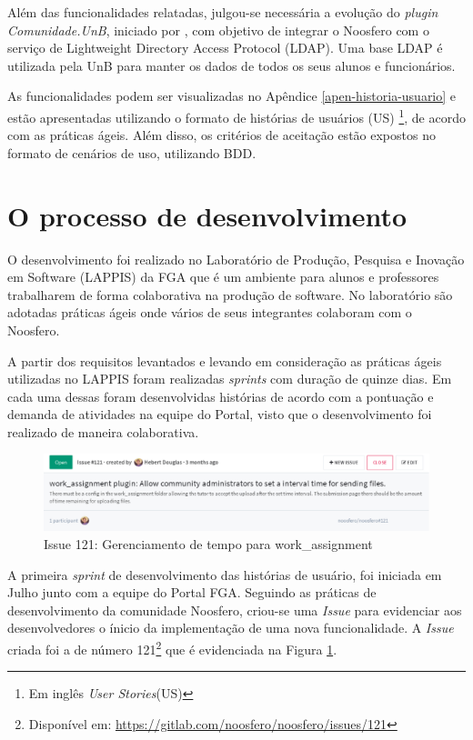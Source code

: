 Além das funcionalidades relatadas, julgou-se necessária a evolução do \textit{plugin Comunidade.UnB}, iniciado por , com objetivo de integrar o Noosfero com o serviço de Lightweight Directory Access Protocol (LDAP). Uma base LDAP é utilizada pela UnB para manter os dados de todos os seus alunos e funcionários.

As funcionalidades podem ser visualizadas no Apêndice \ref{apen-historia-usuario} e estão apresentadas utilizando o formato de histórias de usuários (US) \footnote{Em inglês \textit{User Stories}(US)}, de acordo com as práticas ágeis. Além disso, os critérios de aceitação estão expostos no formato de cenários de uso, utilizando BDD.

\section{O processo de desenvolvimento}

O desenvolvimento foi realizado no Laboratório de Produção, Pesquisa e Inovação em Software (LAPPIS) da FGA que é um ambiente para  alunos e professores trabalharem de forma colaborativa na produção de software. No laboratório são adotadas práticas ágeis onde vários de seus integrantes colaboram com o Noosfero.

A partir dos requisitos levantados e levando em consideração as práticas ágeis utilizadas no LAPPIS foram realizadas \textit{sprints} com duração de quinze dias. Em cada uma dessas foram desenvolvidas histórias de acordo com a pontuação e demanda de atividades na equipe do Portal, visto que o desenvolvimento foi realizado de maneira colaborativa.

\begin{figure}[h]
    \centering
    \includegraphics[keepaspectratio=true,scale=0.4]
      {figuras/issue121.eps}
    \caption{Issue 121: Gerenciamento de tempo para work\_assignment}
    \label{fig:issue-121}
\end{figure}

A primeira \textit{sprint} de desenvolvimento das histórias de usuário, foi iniciada em Julho junto com a equipe do Portal FGA. Seguindo as práticas de desenvolvimento da comunidade Noosfero, criou-se uma \textit{Issue} para evidenciar aos desenvolvedores o ínicio da implementação de uma nova funcionalidade. A \textit{Issue} criada foi a de número 121\footnote{Disponível em: \url{https://gitlab.com/noosfero/noosfero/issues/121}} que  é evidenciada na Figura \ref{fig:issue-121}.

